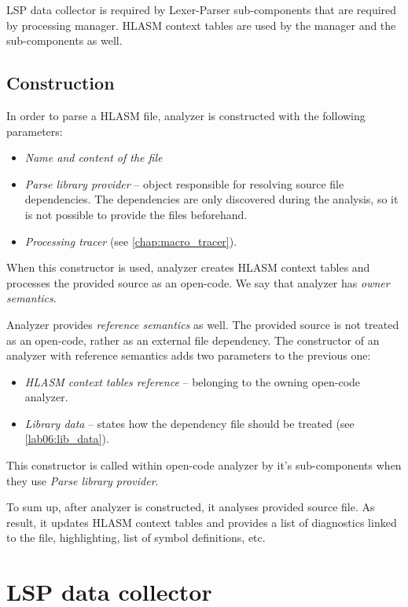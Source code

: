 LSP data collector is required by Lexer-Parser sub-components that are required by processing manager. HLASM context tables are used by the manager and the sub-components as well.

\subsection{Construction}

In order to parse a HLASM file, analyzer is constructed with the following parameters:
\begin{itemize}
	\item \emph{Name and content of the file}
	\item \emph{Parse library provider} -- object responsible for resolving source file dependencies. The dependencies are only discovered during the analysis, so it is not possible to provide the files beforehand.
	\item \emph{Processing tracer} (see \cref{chap:macro_tracer}).
\end{itemize}

When this constructor is used, analyzer creates HLASM context tables and processes the provided source as an open-code. We say that analyzer has \emph{owner semantics}. 
 
Analyzer provides \emph{reference semantics} as well. The provided source is not treated as an open-code, rather as an external file dependency. The constructor of an analyzer with reference semantics adds two parameters to the previous one:
\begin{itemize}
	\item \emph{HLASM context tables reference} -- belonging to the owning open-code analyzer.
	\item \emph{Library data} -- states how the dependency file should be treated (see \cref{lab06:lib_data}).
\end{itemize}

This constructor is called within open-code analyzer by it's sub-components when they use \emph{Parse library provider}.

\vspace{0.5cm}

To sum up, after analyzer is constructed, it analyses provided source file. As result, it updates HLASM context tables and provides a list of diagnostics linked to the file, highlighting, list of symbol definitions, etc.

\section{LSP data collector}

